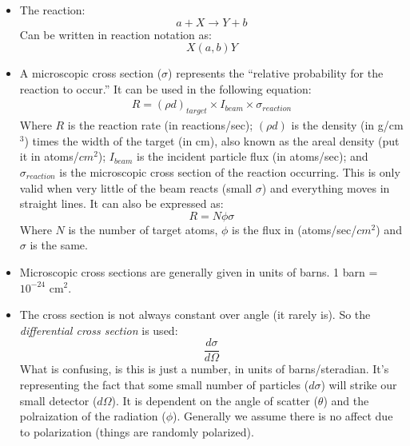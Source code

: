 \documentclass[letter]{article}
\begin{document}
\begin{itemize}
\item The reaction:
  \begin{equation*}
    a + X \to Y + b
  \end{equation*}
Can be written in reaction notation as:
\begin{equation*}
  X(a,b)Y
\end{equation*}
\cite[pp. 378-379]{krane}
\item A microscopic cross section ($\sigma$) represents the ``relative
  probability for the reaction to occur.'' It can be used in the
  following equation:
  \begin{equation*}
    \begin{split}
      R= (\rho{}d)_{target}\times{}I_{beam}\times\sigma_{reaction}
    \end{split}
  \end{equation*}
Where $R$ is the reaction rate (in reactions/sec); $(\rho{}d)$ is the
density (in g/cm$^3$) times the width of the target (in cm), also
known as the areal density (put it in atoms/$cm^2$); $I_{beam}$ is the incident particle flux
(in atoms/sec); and $\sigma_{reaction}$ is the microscopic cross
section of the reaction occurring. This is only valid when very little
of the beam reacts (small $\sigma$) and everything moves in straight
lines. It can also be expressed as:
\begin{equation*}
        R= N\phi\sigma
\end{equation*}
Where $N$ is the number of target atoms, $\phi$ is the flux in
(atoms/sec/$cm^2$) and $\sigma$ is the same.~\cite[Lec. 25]{lecture}
\item Microscopic cross sections are generally given in units of
  barns. 1 barn = $10^{-24}$ cm$^2$.
  \item The cross section is not always constant over angle (it rarely
    is). So the \textit{differential cross section} is used:
    \begin{equation*}
      \frac{d\sigma}{d\Omega}
    \end{equation*}
    What is confusing, is this is just
    a number, in units of barns/steradian. It's
    representing the fact that some small number of particles
    ($d\sigma$) will strike our small detector ($d\Omega$). It is
    dependent on the angle of scatter ($\theta$) and the polraization
    of the radiation ($\phi$). Generally we assume there is no affect
    due to polarization (things are randomly polarized).


\end{itemize}
\end{document}
